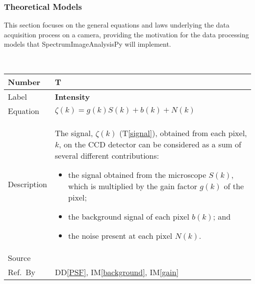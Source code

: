 \documentclass[12pt]{article}
\newcommand{\colAwidth}{0.13\textwidth}
\newcommand{\colBwidth}{0.82\textwidth}
\newcommand{\ddref}[1]{DD\ref{#1}}
\newcounter{theorynum} %
\newcommand{\tref}[1]{T\ref{#1}}
\newcommand{\iref}[1]{IM\ref{#1}}
\newcommand{\progname}{SpectrumImageAnalysisPy} %
\begin{document}
\subsubsection{Theoretical Models}\label{sssec:TM}

This section focuses on the general equations and laws underlying the data
acquisition process on a camera, providing the motivation for the data
processing models that \progname{} will implement.

~\newline

\noindent
\begin{minipage}{\textwidth}
	\renewcommand*{\arraystretch}{1.5}
	\begin{tabular}{| p{\colAwidth} | p{\colBwidth}|}
		  \hline
		  \rowcolor[gray]{0.9}
		  Number& T{theorynum}\thetheorynum \label{intensity}\\
		  \hline
		  Label&\bf Intensity \\
		  \hline
		  Equation& $\zeta(k) = g(k) S(k) + b(k) + N(k)$ \\
		  \hline
		  Description & The signal, $\zeta(k)$ (\tref{signal}), obtained from each
pixel, $k$, on the CCD detector can be considered as a sum of several different
contributions: 
		  \begin{itemize}
			\item the signal obtained from the microscope $S(k)$, which is multiplied by
the gain factor $g(k)$ of the pixel; 
			\item the background signal of each pixel $b(k)$; and
			\item the noise present at each pixel $N(k)$.
		  \end{itemize}\\
		  \hline
		  Source & \cite{zuo_electron_2000}\\
		  \hline
		  Ref.\ By & \ddref{PSF}, \iref{background}, \iref{gain} \\
		  \hline
	\end{tabular}
\end{minipage}\\

~\newline
\end{document}

